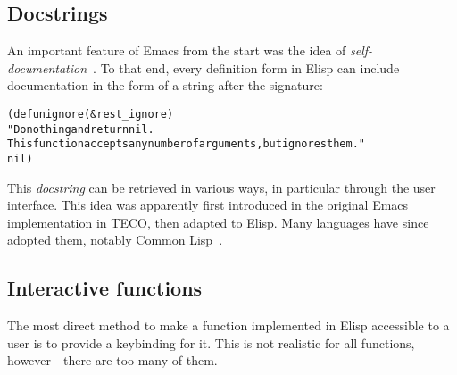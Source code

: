 \documentclass[format=acmsmall, review=false, screen=true]{acmart}
\newcommand \Elisp {Elisp}
\begin{document}

\subsection{Docstrings}
\label{sec:docstrings}

An important feature of Emacs from the start was the idea of
\textit{self-documentation}~\cite{Stallman1981}.  To that end, every
definition form in \Elisp{} can include documentation in the form of a
string after the signature:
%
\begin{alltt}
(defun ignore (&rest _ignore)
  "Do nothing and return nil.
This function accepts any number of arguments, but ignores them."
  nil)
\end{alltt}
%
This \textit{docstring} can be retrieved in various ways, in particular
through the user interface.  This idea was apparently first introduced in
the original Emacs implementation in TECO, then adapted to \Elisp{}.
Many languages have since adopted them, notably Common
Lisp~\cite{HyperSpec}.

\subsection{Interactive functions}
\label{sec:interactive-functions}

The most direct method to make a function implemented in \Elisp{}
accessible to a user is to provide a keybinding for it.  This is not
realistic for all functions, however---there are too many of them.
\end{document}
